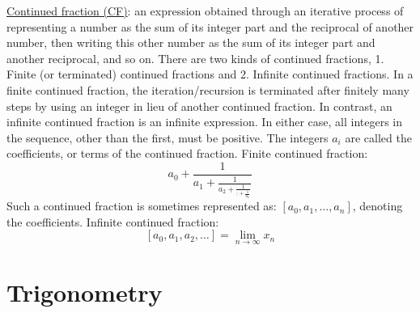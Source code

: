\documentclass[12pt]{article}
\begin{document}
\begin{flushleft}
	\textbullet \quad \uline{Continued fraction (CF)}: an expression obtained through an iterative process of representing a number as the sum of its integer part and the reciprocal of another number, then writing this other number as the sum of its integer part and another reciprocal, and so on. There are two kinds of continued fractions, 1. Finite (or terminated) continued fractions and 2. Infinite continued fractions. In a finite continued fraction, the iteration/recursion is terminated after finitely many steps by using an integer in lieu of another continued fraction. In contrast, an infinite continued fraction is an infinite expression. In either case, all integers in the sequence, other than the first, must be positive. The integers $a_i$ are called the coefficients, or terms of the continued fraction. \linebreak 	
	\textbullet \quad Finite continued fraction: \linebreak 
	$$ a_0 + \frac{1}{a_1 + \frac{1}{a_2 + \frac{1}{\vdots +  \frac{1}{a_n}}}} $$ 
	Such a continued fraction is sometimes represented as: $[a_0, a_1, \ldots , a_n]$, denoting the coefficients. \linebreak 
	\textbullet \quad Infinite continued fraction: \linebreak 
	$$ [a_0, a_1, a_2, \ldots ] = \lim_{n\to \infty} x_n $$	
	
	
	\pagebreak
	
	
	\section{Trigonometry}
	

\end{flushleft}
\end{document}
